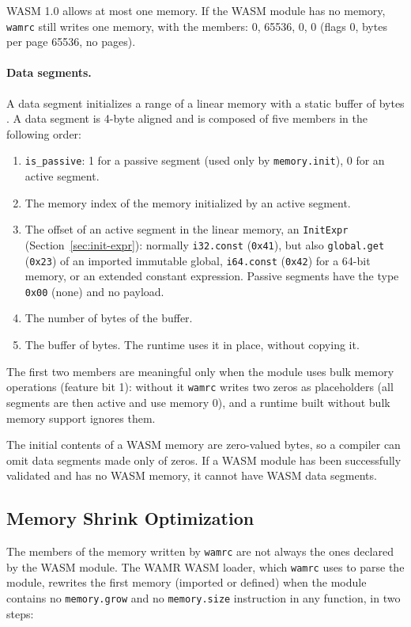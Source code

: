 \documentclass{article}
\begin{document}
WASM 1.0 allows at most one memory.
If the WASM module has no memory, \texttt{wamrc} still writes one memory, with the members: 0, 65536, 0, 0 (flags 0, bytes per page 65536, no pages).

\paragraph{Data segments.}
A data segment initializes a range of a linear memory with a static buffer of bytes \cite[Sec.~5.5.14]{webassembly2019core}.
A data segment is 4-byte aligned and is composed of five members in the following order:
\begin{enumerate}
    \item \verb|is_passive|: 1 for a passive segment (used only by \verb|memory.init|), 0 for an active segment.
    \item The memory index of the memory initialized by an active segment.
    \item The offset of an active segment in the linear memory, an \verb|InitExpr| (Section~\ref{sec:init-expr}): normally \verb|i32.const| (\verb|0x41|), but also \verb|global.get| (\verb|0x23|) of an imported immutable global, \verb|i64.const| (\verb|0x42|) for a 64-bit memory, or an extended constant expression.
        Passive segments have the type \verb|0x00| (none) and no payload.
    \item The number of bytes of the buffer.
    \item The buffer of bytes. The runtime uses it in place, without copying it.
\end{enumerate}
The first two members are meaningful only when the module uses bulk memory operations (feature bit 1): without it \texttt{wamrc} writes two zeros as placeholders (all segments are then active and use memory 0), and a runtime built without bulk memory support ignores them.

The initial contents of a WASM memory are zero-valued bytes, so a compiler can omit data segments made only of zeros.
If a WASM module has been successfully validated and has no WASM memory, it cannot have WASM data segments.

\subsection{Memory Shrink Optimization}
\label{sec:memory-shrink}

The members of the memory written by \texttt{wamrc} are not always the ones declared by the WASM module.
The WAMR WASM loader, which \texttt{wamrc} uses to parse the module, rewrites the first memory (imported or defined) when the module contains no \verb|memory.grow| and no \verb|memory.size| instruction in any function, in two steps:
\end{document}
